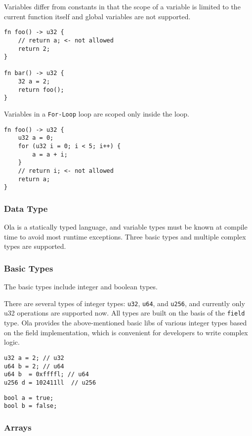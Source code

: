 Variables differ from constants in that the scope of a variable is limited to the current function itself and global variables are not supported.

\begin{lstlisting}
fn foo() -> u32 {
    // return a; <- not allowed
    return 2;
}

fn bar() -> u32 {
    32 a = 2;
    return foo();
}
\end{lstlisting}

Variables in a \texttt{For-Loop} loop are scoped only inside the loop.

\begin{lstlisting}
fn foo() -> u32 {
    u32 a = 0;
    for (u32 i = 0; i < 5; i++) {
        a = a + i;
    }
    // return i; <- not allowed
    return a;
}
\end{lstlisting}

\subsubsection{Data Type}

Ola is a statically typed language, and variable types must be known at compile time to avoid most runtime exceptions. 
Three basic types and multiple complex types are supported.

\subsubsection*{Basic Types}

The basic types include integer and boolean types.

There are several types of integer types: \texttt{u32}, \texttt{u64}, and \texttt{u256}, and currently only u32 operations are supported now. 
All types are built on the basis of the \texttt{field} type.
Ola provides the above-mentioned basic libs of various integer types based on the field implementation, which is convenient for developers to write complex logic.

\begin{lstlisting}
u32 a = 2; // u32
u64 b = 2; // u64
u64 b  = 0xffffl; // u64
u256 d = 102411ll  // u256
\end{lstlisting}

\begin{lstlisting}
bool a = true;
bool b = false;
\end{lstlisting}
\subsubsection*{Arrays}

